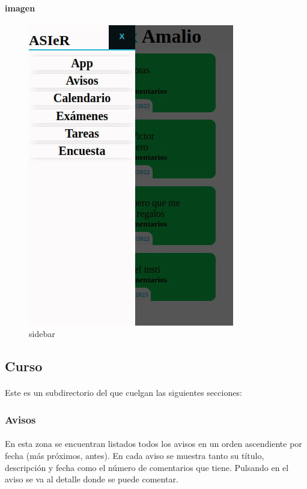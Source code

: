 \documentclass[a4paper]{article}
\begin{document}
\paragraph{imagen}
\begin{figure}[ht]
   \includegraphics[scale=0.5]{./assets/sidebar.jpg}
   \centering
   \caption{sidebar}
   \label{fig:sidebar}
\end{figure}
\newpage
\subsection[/app/curso]{Curso}
\paragraph{}
Este es un subdirectorio del que cuelgan las siguientes secciones:
\subsubsection[/app/curso/avisos]{Avisos}
\paragraph{}
En esta zona se encuentran listados todos los avisos en un orden ascendiente por fecha 
(más próximos, antes). En cada aviso se muestra tanto su título, descripción y fecha como 
el número de comentarios que tiene. Pulsando en el aviso se va al detalle donde se puede comentar.
\end{document}
